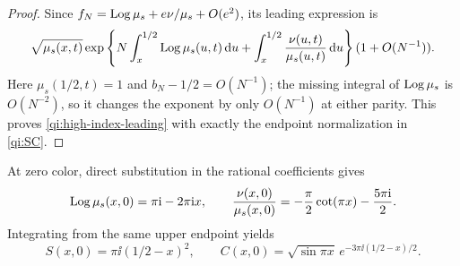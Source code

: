 \begin{proof}
Since $f_N=\operatorname{Log}\mu_s+e\nu/\mu_s+O(e^2)$, its leading expression is
\[
 \sqrt{\mu_s(x,t)}
 \exp\left\{N\int_x^{1/2}\operatorname{Log}\mu_s(u,t)\,\mathrm d u
          +\int_x^{1/2}\frac{\nu(u,t)}{\mu_s(u,t)}\,\mathrm d u\right\}
 (1+O(N^{-1})).
\]
Here $\mu_s(1/2,t)=1$ and $b_N-1/2=O(N^{-1})$; the missing
integral of $\operatorname{Log}\mu_s$ is $O(N^{-2})$, so it changes the
exponent by only $O(N^{-1})$ at either parity. This proves
\eqref{qi:high-index-leading} with exactly the endpoint normalization
in \eqref{qi:SC}.
\end{proof}

At zero color, direct substitution in the rational coefficients gives
\[
 \operatorname{Log}\mu_s(x,0)=\pi\mathrm i-2\pi\mathrm i x,\qquad
 \frac{\nu(x,0)}{\mu_s(x,0)}
       =-\frac\pi2\cot(\pi x)-\frac{5\pi\mathrm i}{2}.
\]
Integrating from the same upper endpoint yields
\begin{equation}\label{qi:high-index-complete}
 S(x,0)=\pi\ii(1/2-x)^2,\qquad
 C(x,0)=\sqrt{\sin\pi x}\,
       e^{-3\pi\ii(1/2-x)/2}.
\end{equation}
